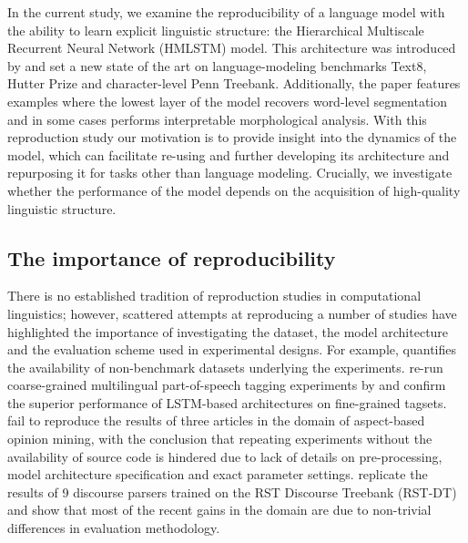 In the current study, we examine the reproducibility of a 
language model with the ability to learn explicit linguistic structure: the 
Hierarchical Multiscale Recurrent Neural Network  (HMLSTM) model. This 
architecture was introduced by \citet{chung2016hierarchical} and set a 
new state of the art on language-modeling benchmarks Text8, Hutter Prize 
and character-level Penn Treebank. Additionally, the paper features 
examples where the lowest layer of the model recovers word-level segmentation
and in some cases performs interpretable morphological analysis. 
With this reproduction study our motivation is to provide insight into the
dynamics of the model, which can facilitate re-using and further 
developing its architecture and repurposing it for tasks other than 
language modeling. Crucially, we investigate whether the performance of the model 
depends on the acquisition of high-quality linguistic structure.




\subsection{The importance of reproducibility}

There is no established tradition of reproduction studies in 
computational linguistics; however, scattered attempts at reproducing a 
number of studies have highlighted the importance of investigating the 
dataset, the model architecture and the evaluation scheme used in 
experimental designs.  For example, \citet{mieskes2017quantitative} 
quantifies the availability of non-benchmark datasets underlying the
experiments. \citet{horsmann2017lstms} re-run coarse-grained
multilingual part-of-speech tagging experiments by
\citet{plank2016multilingual} and confirm the superior performance of
LSTM-based architectures on fine-grained tagsets. 
\citet{marrese2017replication} fail to reproduce the results of three
articles in the domain of aspect-based opinion mining, with the
conclusion that repeating experiments without the availability of
source code is hindered due to lack of details on pre-processing, model architecture specification and exact parameter
settings. \citet{morey2017much} replicate the results of 9 discourse parsers
trained on the RST Discourse Treebank (RST-DT)
\citep{carlson2003building} and show that most of the recent gains in
the domain are due to non-trivial differences in evaluation
methodology. 

